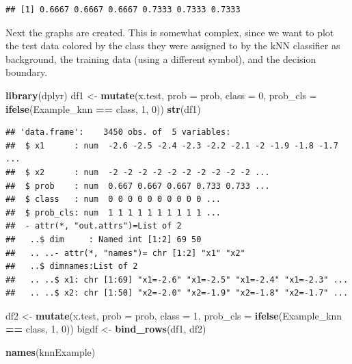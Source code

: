 \documentclass[
]{krantz}
\newenvironment{Shaded}{\begin{snugshade}}{\end{snugshade}}
\newcommand{\DataTypeTok}[1]{\textcolor[rgb]{0.13,0.29,0.53}{#1}}
\newcommand{\DecValTok}[1]{\textcolor[rgb]{0.00,0.00,0.81}{#1}}
\newcommand{\KeywordTok}[1]{\textcolor[rgb]{0.13,0.29,0.53}{\textbf{#1}}}
\newcommand{\NormalTok}[1]{#1}
\newcommand{\OperatorTok}[1]{\textcolor[rgb]{0.81,0.36,0.00}{\textbf{#1}}}
\newcommand{\StringTok}[1]{\textcolor[rgb]{0.31,0.60,0.02}{#1}}
\begin{document}
\begin{verbatim}
## [1] 0.6667 0.6667 0.6667 0.7333 0.7333 0.7333
\end{verbatim}

Next the graphs are created. This is somewhat complex, since we want to plot the test data colored by the class they were assigned to by the kNN classifier as background, the training data (using a different symbol), and the decision boundary.

\begin{Shaded}
\begin{Highlighting}[]
\KeywordTok{library}\NormalTok{(dplyr)}
\NormalTok{df1 \textless{}{-}}\StringTok{ }\KeywordTok{mutate}\NormalTok{(x.test, }\DataTypeTok{prob =}\NormalTok{ prob, }\DataTypeTok{class =} \DecValTok{0}\NormalTok{,  }
          \DataTypeTok{prob\_cls =} \KeywordTok{ifelse}\NormalTok{(Example\_knn }\OperatorTok{==}\StringTok{ }\NormalTok{class, }\DecValTok{1}\NormalTok{, }\DecValTok{0}\NormalTok{))}
\KeywordTok{str}\NormalTok{(df1)}
\end{Highlighting}
\end{Shaded}

\begin{verbatim}
## 'data.frame':    3450 obs. of  5 variables:
##  $ x1      : num  -2.6 -2.5 -2.4 -2.3 -2.2 -2.1 -2 -1.9 -1.8 -1.7 ...
##  $ x2      : num  -2 -2 -2 -2 -2 -2 -2 -2 -2 -2 ...
##  $ prob    : num  0.667 0.667 0.667 0.733 0.733 ...
##  $ class   : num  0 0 0 0 0 0 0 0 0 0 ...
##  $ prob_cls: num  1 1 1 1 1 1 1 1 1 1 ...
##  - attr(*, "out.attrs")=List of 2
##   ..$ dim     : Named int [1:2] 69 50
##   .. ..- attr(*, "names")= chr [1:2] "x1" "x2"
##   ..$ dimnames:List of 2
##   .. ..$ x1: chr [1:69] "x1=-2.6" "x1=-2.5" "x1=-2.4" "x1=-2.3" ...
##   .. ..$ x2: chr [1:50] "x2=-2.0" "x2=-1.9" "x2=-1.8" "x2=-1.7" ...
\end{verbatim}

\begin{Shaded}
\begin{Highlighting}[]
\NormalTok{df2 \textless{}{-}}\StringTok{ }\KeywordTok{mutate}\NormalTok{(x.test, }\DataTypeTok{prob =}\NormalTok{ prob, }\DataTypeTok{class =} \DecValTok{1}\NormalTok{,  }
          \DataTypeTok{prob\_cls =} \KeywordTok{ifelse}\NormalTok{(Example\_knn }\OperatorTok{==}\StringTok{ }\NormalTok{class, }\DecValTok{1}\NormalTok{, }\DecValTok{0}\NormalTok{))}
\NormalTok{bigdf \textless{}{-}}\StringTok{ }\KeywordTok{bind\_rows}\NormalTok{(df1, df2)}

\KeywordTok{names}\NormalTok{(knnExample)}
\end{Highlighting}
\end{Shaded}
\end{document}
